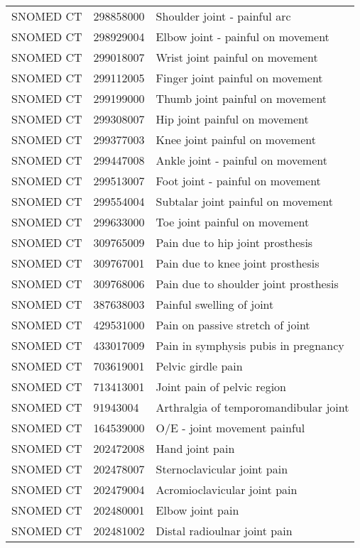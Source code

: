 \begin{longtable}{p{}p{}p{}}
  SNOMED CT & 298858000 & Shoulder joint - painful arc \\ 
  SNOMED CT & 298929004 & Elbow joint - painful on movement \\ 
  SNOMED CT & 299018007 & Wrist joint painful on movement \\ 
  SNOMED CT & 299112005 & Finger joint painful on movement \\ 
  SNOMED CT & 299199000 & Thumb joint painful on movement \\ 
  SNOMED CT & 299308007 & Hip joint painful on movement \\ 
  SNOMED CT & 299377003 & Knee joint painful on movement \\ 
  SNOMED CT & 299447008 & Ankle joint - painful on movement \\ 
  SNOMED CT & 299513007 & Foot joint - painful on movement \\ 
  SNOMED CT & 299554004 & Subtalar joint painful on movement \\ 
  SNOMED CT & 299633000 & Toe joint painful on movement \\ 
  SNOMED CT & 309765009 & Pain due to hip joint prosthesis \\ 
  SNOMED CT & 309767001 & Pain due to knee joint prosthesis \\ 
  SNOMED CT & 309768006 & Pain due to shoulder joint prosthesis \\ 
  SNOMED CT & 387638003 & Painful swelling of joint \\ 
  SNOMED CT & 429531000 & Pain on passive stretch of joint \\ 
  SNOMED CT & 433017009 & Pain in symphysis pubis in pregnancy \\ 
  SNOMED CT & 703619001 & Pelvic girdle pain \\ 
  SNOMED CT & 713413001 & Joint pain of pelvic region \\ 
  SNOMED CT & 91943004 & Arthralgia of temporomandibular joint \\ 
  SNOMED CT & 164539000 & O/E - joint movement painful \\ 
  SNOMED CT & 202472008 & Hand joint pain \\ 
  SNOMED CT & 202478007 & Sternoclavicular joint pain \\ 
  SNOMED CT & 202479004 & Acromioclavicular joint pain \\ 
  SNOMED CT & 202480001 & Elbow joint pain \\ 
  SNOMED CT & 202481002 & Distal radioulnar joint pain \\ 

\end{longtable}
